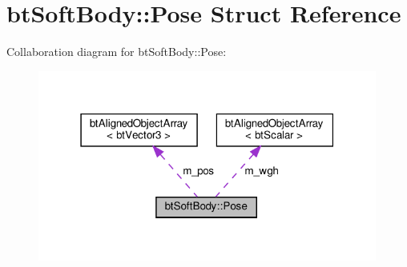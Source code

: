 \hypertarget{structbtSoftBody_1_1Pose}{}\section{bt\+Soft\+Body\+:\+:Pose Struct Reference}
\label{structbtSoftBody_1_1Pose}


Collaboration diagram for bt\+Soft\+Body\+:\+:Pose\+:
\nopagebreak
\begin{figure}[H]
\begin{center}
\leavevmode
\includegraphics[width=316pt]{structbtSoftBody_1_1Pose__coll__graph}
\end{center}
\end{figure}
